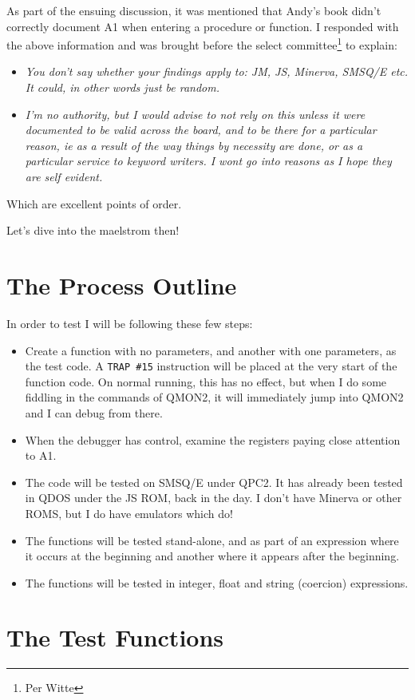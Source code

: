 As part of the ensuing discussion, it was mentioned that Andy's book
didn't correctly document A1 when entering a procedure or function.
I responded with the above information and was brought before the
select committee\footnote{Per Witte} to explain:
\begin{itemize}
\item \emph{You don't say whether your findings apply to: JM, JS, Minerva,
SMSQ/E etc. It could, in other words just be random.}
\item \emph{I'm no authority, but I would advise to not rely on this unless
it were documented to be valid across the board, and to be there for
a particular reason, ie as a result of the way things by necessity
are done, or as a particular service to keyword writers. I wont go
into reasons as I hope they are self evident. }
\end{itemize}
Which are excellent points of order.

Let's dive into the maelstrom then!

\section{The Process Outline}

In order to test I will be following these few steps:
\begin{itemize}
\item Create a function with no parameters, and another with one parameters,
as the test code. A \texttt{TRAP \#15} instruction will be placed
at the very start of the function code. On normal running, this has
no effect, but when I do some fiddling in the commands of QMON2, it
will immediately jump into QMON2 and I can debug from there.
\item When the debugger has control, examine the registers paying close
attention to A1.
\item The code will be tested on SMSQ/E under QPC2. It has already been
tested in QDOS under the JS ROM, back in the day. I don't have Minerva
or other ROMS, but I do have emulators which do!
\item The functions will be tested stand-alone, and as part of an expression
where it occurs at the beginning and another where it appears after
the beginning.
\item The functions will be tested in integer, float and string (coercion)
expressions.
\end{itemize}

\section{The Test Functions}

